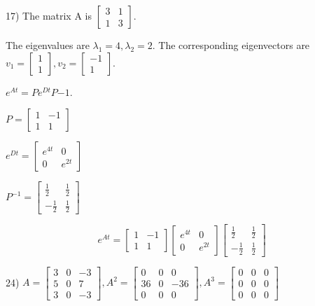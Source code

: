 \documentclass{article}
\begin{document}
17) The matrix A is $\begin{bmatrix}
    3 & 1 \\
    1 & 3
\end{bmatrix}$.

The eigenvalues are $\lambda_1 = 4, \lambda_2 = 2$.
The corresponding eigenvectors are $v_1 = \begin{bmatrix}
    1 \\
    1
\end{bmatrix}, v_2 = \begin{bmatrix}
    -1 \\
    1
\end{bmatrix}$.

$e^{At} = P e^{Dt} P{-1}$.

$P = \begin{bmatrix}
    1 & -1 \\
    1 & 1
\end{bmatrix}$

$e^{Dt} = \begin{bmatrix}
    e^{4t} & 0 \\
    0 & e^{2t}
\end{bmatrix}$

$P^{-1} = \begin{bmatrix}
    \frac{1}{2} & \frac{1}{2} \\
    -\frac{1}{2} & \frac{1}{2}
\end{bmatrix}$

\[e^{At} = \begin{bmatrix}
    1 & -1 \\
    1 & 1
\end{bmatrix} \begin{bmatrix}
    e^{4t} & 0 \\
    0 & e^{2t}
\end{bmatrix} \begin{bmatrix}
    \frac{1}{2} & \frac{1}{2} \\
    -\frac{1}{2} & \frac{1}{2}
\end{bmatrix}\]

24) $A = \begin{bmatrix}
    3 & 0 & -3 \\
    5 & 0 & 7 \\
    3 & 0 & -3
\end{bmatrix}, A^2 = \begin{bmatrix}
    0 & 0 & 0 \\
    36 & 0 & -36 \\
    0 & 0 & 0
\end{bmatrix}, A^3 = \begin{bmatrix}
    0 & 0 & 0 \\
    0 & 0 & 0 \\
    0 & 0 & 0
\end{bmatrix}$
\end{document}
